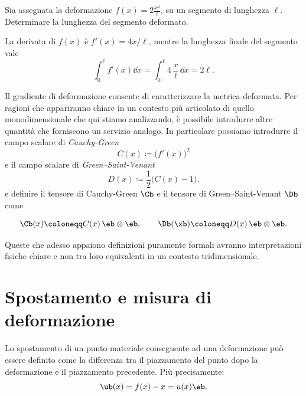\begin{exercise}
Sia assegnata la deformazione $f(x)=2\frac{x^2}{\ell}$, su un segmento di lunghezza $\ell$. Determinare la lunghezza del segmento deformato. 
\begin{svolgimento}
	La derivata di $f(x)$ è $f'(x)=4x/\ell$, mentre la lunghezza finale del segmento vale
	\begin{equation}
		\int_{0}^\ell f'(x)\dd x=	\int_{0}^\ell 4\,\frac{x}{\ell}\,\dd x=2 \ell.
	\end{equation}
\end{svolgimento}
\end{exercise}



Il gradiente di deformazione consente  di caratterizzare la metrica deformata. Per ragioni che appariranno chiare in un contesto più articolato di quello  monodimensionale che qui stiamo analizzando, è possibile introdurre altre quantità che forniscono un servizio analogo. In particolare possiamo introdurre il campo scalare di \textit{Cauchy-Green}
\begin{equation}
	C(x)\coloneqq \big(f'(x)\big)^2
\end{equation}
e il campo scalare di \textit{Green--Saint-Venant}
\begin{equation}
	D(x)\coloneqq\frac{1}{2}\big( C(x)-1 \big).
\end{equation}
e definire il tensore di Cauchy-Green $\Cb$ e il tensore di Green--Saint-Venant $\Db$ come
\begin{definition}
\begin{equation}
	\Cb(x)\coloneqq 	C(x)\, \eb \otimes\eb, \qquad \Db(\xb)\coloneqq	D(x)\,\eb \otimes\eb.
\end{equation}
\end{definition}

Queste che adesso appaiono definizioni puramente formali avranno interpretazioni fisiche chiare  e non tra loro equivalenti in un contesto tridimensionale.

\section{Spostamento e misura di deformazione}
Lo spostamento di un punto materiale conseguente ad una deformazione può essere definito come la differenza tra il piazzamento del punto dopo la deformazione e il piazzamento precedente.
Più precisamente:
\begin{equation}\label{spdef}
\ub(x)=f(x)-x=u(x)\eb.
\end{equation}

